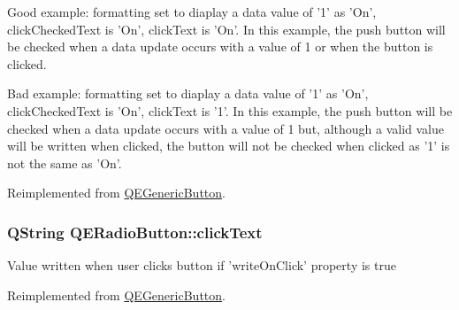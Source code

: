 Good example: formatting set to diaplay a data value of '1' as 'On', clickCheckedText is 'On', clickText is 'On'. In this example, the push button will be checked when a data update occurs with a value of 1 or when the button is clicked.

Bad example: formatting set to diaplay a data value of '1' as 'On', clickCheckedText is 'On', clickText is '1'. In this example, the push button will be checked when a data update occurs with a value of 1 but, although a valid value will be written when clicked, the button will not be checked when clicked as '1' is not the same as 'On'. 

Reimplemented from \hyperlink{classQEGenericButton}{QEGenericButton}.

\hypertarget{classQERadioButton_a0e01a1f96bdf5c10665bba5746ea5f99}{
\subsubsection[{clickText}]{\setlength{\rightskip}{0pt plus 5cm}QString QERadioButton::clickText}}
\label{classQERadioButton_a0e01a1f96bdf5c10665bba5746ea5f99}
Value written when user clicks button if 'writeOnClick' property is true 

Reimplemented from \hyperlink{classQEGenericButton}{QEGenericButton}.

